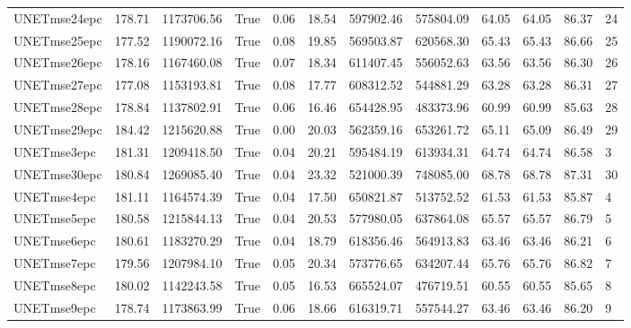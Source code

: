 \begin{tabular}{lrrlrrrrrrrl}
UNETmse24epc & 178.71 & 1173706.56 & True & 0.06 & 18.54 & 597902.46 & 575804.09 & 64.05 & 64.05 & 86.37 & 24 \\
UNETmse25epc & 177.52 & 1190072.16 & True & 0.08 & 19.85 & 569503.87 & 620568.30 & 65.43 & 65.43 & 86.66 & 25 \\
UNETmse26epc & 178.16 & 1167460.08 & True & 0.07 & 18.34 & 611407.45 & 556052.63 & 63.56 & 63.56 & 86.30 & 26 \\
UNETmse27epc & 177.08 & 1153193.81 & True & 0.08 & 17.77 & 608312.52 & 544881.29 & 63.28 & 63.28 & 86.31 & 27 \\
UNETmse28epc & 178.84 & 1137802.91 & True & 0.06 & 16.46 & 654428.95 & 483373.96 & 60.99 & 60.99 & 85.63 & 28 \\
UNETmse29epc & 184.42 & 1215620.88 & True & 0.00 & 20.03 & 562359.16 & 653261.72 & 65.11 & 65.09 & 86.49 & 29 \\
UNETmse3epc & 181.31 & 1209418.50 & True & 0.04 & 20.21 & 595484.19 & 613934.31 & 64.74 & 64.74 & 86.58 & 3 \\
UNETmse30epc & 180.84 & 1269085.40 & True & 0.04 & 23.32 & 521000.39 & 748085.00 & 68.78 & 68.78 & 87.31 & 30 \\
UNETmse4epc & 181.11 & 1164574.39 & True & 0.04 & 17.50 & 650821.87 & 513752.52 & 61.53 & 61.53 & 85.87 & 4 \\
UNETmse5epc & 180.58 & 1215844.13 & True & 0.04 & 20.53 & 577980.05 & 637864.08 & 65.57 & 65.57 & 86.79 & 5 \\
UNETmse6epc & 180.61 & 1183270.29 & True & 0.04 & 18.79 & 618356.46 & 564913.83 & 63.46 & 63.46 & 86.21 & 6 \\
UNETmse7epc & 179.56 & 1207984.10 & True & 0.05 & 20.34 & 573776.65 & 634207.44 & 65.76 & 65.76 & 86.82 & 7 \\
UNETmse8epc & 180.02 & 1142243.58 & True & 0.05 & 16.53 & 665524.07 & 476719.51 & 60.55 & 60.55 & 85.65 & 8 \\
UNETmse9epc & 178.74 & 1173863.99 & True & 0.06 & 18.66 & 616319.71 & 557544.27 & 63.46 & 63.46 & 86.20 & 9 \\
\bottomrule
\end{tabular}

